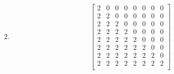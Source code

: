 \documentclass{article}
\theoremstyle{remark}
\begin{document}
\begin{enumerate}
\begin{displaymath}
  \end{displaymath}
\item
  \begin{displaymath}
    \begin{bmatrix}
      2 & 0 & 0 & 0 & 0 & 0 & 0 & 0 \\
      2 & 2 & 0 & 0 & 0 & 0 & 0 & 0 \\
      2 & 2 & 2 & 0 & 0 & 0 & 0 & 0 \\
      2 & 2 & 2 & 2 & 0 & 0 & 0 & 0 \\
      2 & 2 & 2 & 2 & 2 & 0 & 0 & 0 \\
      2 & 2 & 2 & 2 & 2 & 2 & 0 & 0 \\
      2 & 2 & 2 & 2 & 2 & 2 & 2 & 0 \\
      2 & 2 & 2 & 2 & 2 & 2 & 2 & 2 \\
    \end{bmatrix}
  \end{displaymath}
\end{enumerate}
\end{document}
